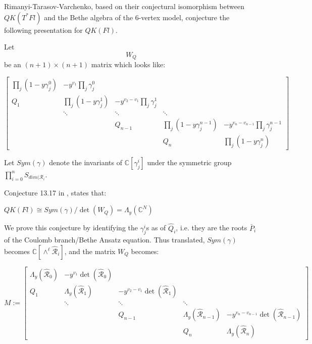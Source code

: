 \documentclass[11pt,letterpaper]{amsart}
\begin{document}
Rimanyi-Tarasov-Varchenko, based on their conjectural isomorphism between $QK(T^*Fl)$ and the Bethe algebra of the 6-vertex model, conjecture the following presentation for $QK(Fl)$. 

Let $$W_Q$$ be an $(n+1)\times (n+1)$ matrix which looks like:


$$\begin{bmatrix}
                \prod_j (1-y\gamma^0_j) & -y^{v_1}\prod_j \gamma^0_j                         &                            &                       &         \\
                Q_1   & \prod_j (1-y\gamma^1_j)      & -y^{v_2-v_1}\prod_j \gamma^1_j                        &                      &           \\                            & \ddots                & \ddots & \ddots & \\                            &                 & Q_{n-1} & \prod_j (1-y\gamma^{n-1}_j)  & -y^{v_{n}-v_{n-1}}\prod_j \gamma^{n-1}_j        \\                        &                      &   &  Q_{n}   & \prod_j (1-y\gamma^n_j)
                \end{bmatrix}$$


Let $Sym(\gamma)$ denote the invariants of $\mathbb{C}[\gamma^i_j]$ under the symmetric group $\prod_{i=0}^n S_{dim(\mathcal{R}_i}$. 

Conjecture 13.17 in \cite{rimanyi2015trigonometric}, states that:

\begin{conj}
    $QK(Fl)\cong Sym(\gamma)/\det(W_Q)=\Lambda_y(\mathbb{C}^N)$
\end{conj}

We prove this conjecture by identifying the $\gamma^i_j$s as  of $\widehat{Q}_i$, i.e. they are the roots $\bar{P}_i$ of the Coulomb branch/Bethe Ansatz equation. Thus translated, $Sym(\gamma)$ becomes $\mathbb{C}[\wedge^\ell \widehat{\mathcal{R}}_i]$, and the matrix $W_Q$ becomes:





$$M:=\begin{bmatrix}
                \Lambda_y(\widehat{\mathcal{R}}_0) & -y^{v_1}\det(\widehat{\mathcal{R}}_0)                         &                            &                       &         \\
                Q_1   & \Lambda_y(\widehat{\mathcal{R}}_1)      & -y^{v_2-v_1}\det(\widehat{\mathcal{R}}_1)                 &                      &           \\                            & \ddots                & \ddots & \ddots & \\                            &                 & Q_{n-1} & \Lambda_y(\widehat{\mathcal{R}}_{n-1})  & -y^{v_{n}-v_{n-1}}\det(\widehat{\mathcal{R}}_{n-1})\\                        &                      &   &  Q_{n}   & \Lambda_y(\widehat{\mathcal{R}}_{n})
                \end{bmatrix}$$
\end{document}
